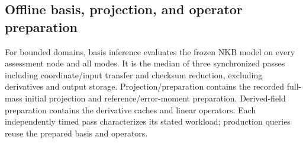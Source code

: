 \subsection{Offline basis, projection, and operator preparation}
For bounded domains, basis inference evaluates the frozen NKB model on every assessment node and all modes.
It is the median of three synchronized passes including coordinate/input transfer
and checksum reduction, excluding derivatives and output storage. Projection/preparation
contains the recorded full-mass initial projection and reference/error-moment preparation.
Derived-field preparation contains the derivative caches and linear operators.
Each independently timed pass characterizes its stated workload; production queries reuse the prepared basis and operators.

\begin{table}[!htb]\centering\footnotesize\setlength{\tabcolsep}{4pt}
\caption{Offline costs in seconds. Basis gives all-node field-evaluation times; periodic entries include analytic derivatives. Projection includes the recorded reference preparation where bundled. Derived means field/linear-operator preparation, and $Q$ denotes accepted assembly of the quadratic tensor $\mathcal Q$. The incl. periodic derivative fields are included in basis evaluation, and their nonlinear loads are matrix-free. n.r. marks components without a separate measurement. The $K=512$ derived cost covers all 512 modes, basis-cache transposition, and linear-operator preparation. These columns exclude neural training and online integration.}
\label{tab:runtime-offline}


\end{table}

